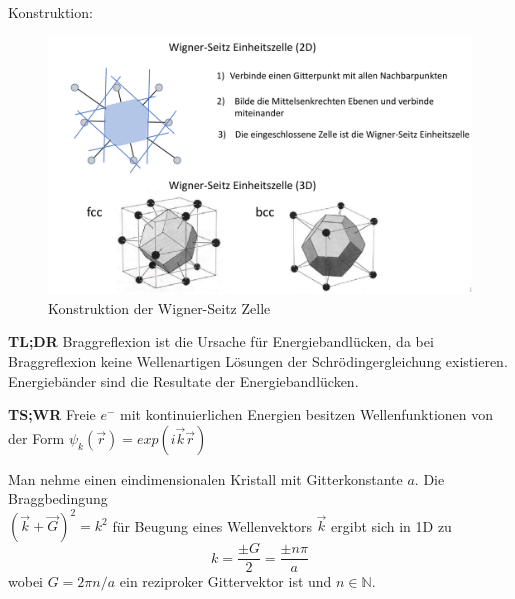 Konstruktion:
\begin{figure}[H]
    \centering
    \includegraphics[width=0.8\linewidth]{resources/15-06-2015/q33.png}
    \caption{Konstruktion der Wigner-Seitz Zelle}
\end{figure}

\label{q:34}

\label{q:35}

\label{q:36}

\label{q:37}

\textbf{TL;DR} Braggreflexion ist die Ursache für Energiebandlücken, da bei Braggreflexion keine Wellenartigen Lösungen der Schrödingergleichung existieren.
Energiebänder sind die Resultate der Energiebandlücken.

\textbf{TS;WR} Freie $e^-$ mit kontinuierlichen Energien besitzen Wellenfunktionen von der Form $\psi_{k}(\vec{r}) = exp(i\vec{k}\vec{r})$

Man nehme einen eindimensionalen Kristall mit Gitterkonstante $a$.
Die Braggbedingung\\$\left(\vec{k} + \vec{G}\right)^2 = k^2$ für Beugung eines Wellenvektors $\vec{k}$ ergibt sich in 1D zu
\begin{equation}
    k = \frac{\pm G}{2} = \frac{\pm n \pi}{a}
\end{equation}
wobei $G = 2\pi n/a$ ein reziproker Gittervektor ist und $n \in \mathbb{N}$.

